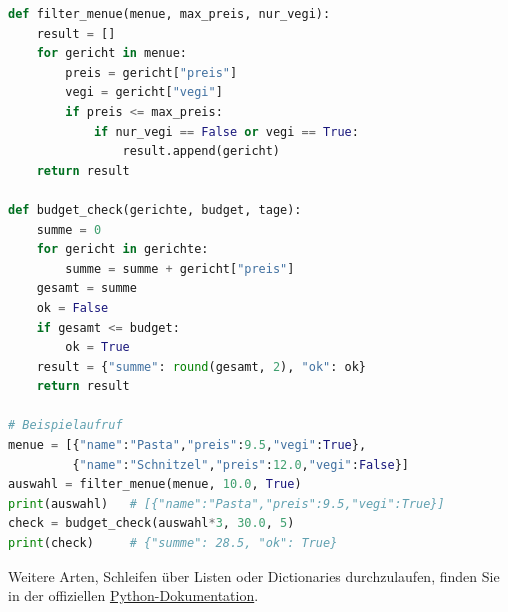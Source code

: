 \begin{myexercise}
	\begin{myanswer}
		\begin{lstlisting}[language=Python]
def filter_menue(menue, max_preis, nur_vegi):
    result = []
    for gericht in menue:
        preis = gericht["preis"]
        vegi = gericht["vegi"]
        if preis <= max_preis:
            if nur_vegi == False or vegi == True:
                result.append(gericht)
    return result

def budget_check(gerichte, budget, tage):
    summe = 0
    for gericht in gerichte:
        summe = summe + gericht["preis"]
    gesamt = summe
    ok = False
    if gesamt <= budget:
        ok = True
    result = {"summe": round(gesamt, 2), "ok": ok}
    return result

# Beispielaufruf
menue = [{"name":"Pasta","preis":9.5,"vegi":True},
         {"name":"Schnitzel","preis":12.0,"vegi":False}]
auswahl = filter_menue(menue, 10.0, True)
print(auswahl)   # [{"name":"Pasta","preis":9.5,"vegi":True}]
check = budget_check(auswahl*3, 30.0, 5)
print(check)     # {"summe": 28.5, "ok": True}
\end{lstlisting}
	\end{myanswer}
\end{myexercise}

\begin{myremark}
	Weitere Arten, Schleifen über Listen oder Dictionaries durchzulaufen, finden Sie in der offiziellen \href{https://docs.python.org/3/tutorial/datastructures.html#looping-techniques}{Python-Dokumentation}.
\end{myremark}